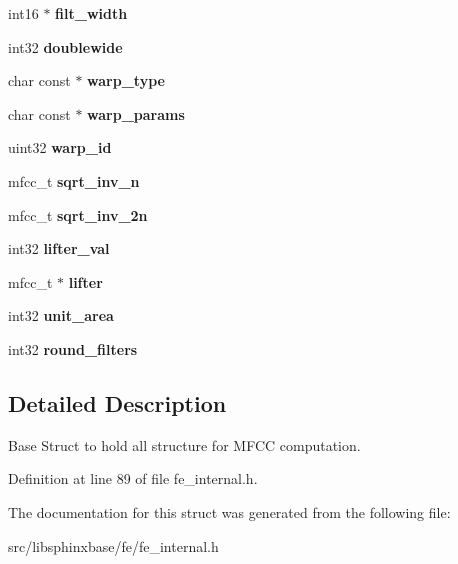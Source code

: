 \begin{DoxyCompactItemize}
\item 
int16 $\ast$ {\bfseries filt\-\_\-width}\label{structmelfb__s_a43c26968a65602f1dce3c02e155eea39}

\item 
int32 {\bfseries doublewide}\label{structmelfb__s_a2f1a3b5e9a985a88dd0a0c57c8e8e682}

\item 
char const $\ast$ {\bfseries warp\-\_\-type}\label{structmelfb__s_a925f6f7a98b33b542f6b53f7c0b1b923}

\item 
char const $\ast$ {\bfseries warp\-\_\-params}\label{structmelfb__s_aa7ba71c21972a822ba7f23391ff92b21}

\item 
uint32 {\bfseries warp\-\_\-id}\label{structmelfb__s_a3b4d756c484accf39aeac42219b2c7ec}

\item 
mfcc\-\_\-t {\bfseries sqrt\-\_\-inv\-\_\-n}\label{structmelfb__s_a1d222190206f979da6f1297197bb6e6b}

\item 
mfcc\-\_\-t {\bfseries sqrt\-\_\-inv\-\_\-2n}\label{structmelfb__s_a09439f191bdf50d17505f0cfcabda229}

\item 
int32 {\bfseries lifter\-\_\-val}\label{structmelfb__s_a605228aea9e9c9028caad09060a07b2e}

\item 
mfcc\-\_\-t $\ast$ {\bfseries lifter}\label{structmelfb__s_a362672e537cb316c538fccc141ad01f8}

\item 
int32 {\bfseries unit\-\_\-area}\label{structmelfb__s_a9fc76cc06249cb211c35c04a31c8a3c1}

\item 
int32 {\bfseries round\-\_\-filters}\label{structmelfb__s_ac2db1578287bd1f5a9b5eed94cc0d987}

\end{DoxyCompactItemize}


\subsection{Detailed Description}
Base Struct to hold all structure for M\-F\-C\-C computation. 



Definition at line 89 of file fe\-\_\-internal.\-h.



The documentation for this struct was generated from the following file\-:\begin{DoxyCompactItemize}
\item 
src/libsphinxbase/fe/fe\-\_\-internal.\-h\end{DoxyCompactItemize}
